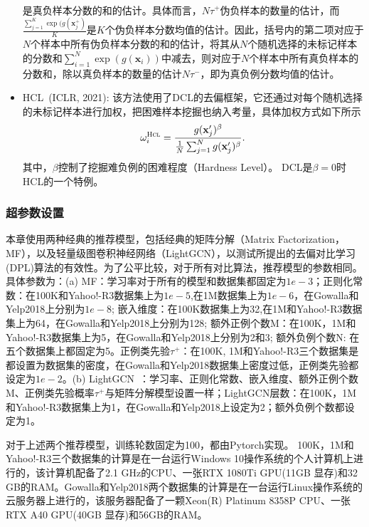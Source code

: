 \begin{itemize}
\begin{eqnarray}
	\end{eqnarray}
	是真负样本分数的和的估计。具体而言，$N\tau^+$伪负样本的数量的估计，而$\frac{\sum_{j=1}^{K} \exp(g(\mathbf{x}^+_j)}{K}$是$K$个伪负样本分数均值的估计。因此，括号内的第二项对应于$N$个样本中所有伪负样本分数的和的估计，将其从$N$个随机选择的未标记样本的分数和$\sum_{i=1}^{N} \exp(g(\mathbf{x}_i))$中减去，则对应于$N$个样本中所有真负样本的分数和，除以真负样本的数量的估计$N\tau^-$，即为真负例分数均值的估计。
	\item HCL~\cite{Robinson:2021:ICLR}(ICLR, 2021): 该方法使用了DCL的去偏框架，它还通过对每个随机选择的未标记样本进行加权，把困难样本挖掘也纳入考量，具体加权方式如下所示
	\begin{eqnarray}\label{eq:hcl}
		\omega_i^\textsc{Hcl} = \frac{g(\mathbf{x}^\prime_j)^\beta}{\frac{1}{N} \sum_{j=1}^{N}g(\mathbf{x}^\prime_j)^\beta}.
	\end{eqnarray}
	其中，$\beta$控制了挖掘难负例的困难程度（Hardness Level）。 DCL是$\beta=0$时HCL的一个特例。
\end{itemize}

\subsubsection{超参数设置}
本章使用两种经典的推荐模型，包括经典的矩阵分解（Matrix Factorization，MF），以及轻量级图卷积神经网络（LightGCN）\cite{Xiangnan:2020:SIGIR}，以测试所提出的去偏对比学习(DPL)算法的有效性。为了公平比较，对于所有对比算法，推荐模型的参数相同。具体参数为：(a) MF：学习率对于所有的模型和数据集都固定为$1e-3$；正则化常数：在100K和Yahoo!-R3数据集上为$1e-5$,在1M数据集上为$1e-6$，在Gowalla和Yelp2018上分别为$1e-8$; 嵌入维度：在100K数据集上为32,在1M和Yahoo!-R3数据集上为64，在Gowalla和Yelp2018上分别为128; 额外正例个数M：在100K，1M和Yahoo!-R3数据集上为5，在Gowalla和Yelp2018上分别为2和3; 额外负例个数N: 在五个数据集上都固定为5。正例类先验$\tau^+$：在100K, 1M和Yahoo!-R3三个数据集是都设置为数据集的密度，在Gowalla和Yelp2018数据集上密度过低，正例类先验都设定为$1e-2$。(b) LightGCN~\cite{Xiangnan:2020:SIGIR}：学习率、正则化常数、嵌入维度、额外正例个数M、正例类先验概率$\tau^+$与矩阵分解模型设置一样；LightGCN层数：在100K，1M和Yahoo!-R3数据集上为1，在Gowalla和Yelp2018上设定为2；额外负例个数都设定为1。

对于上述两个推荐模型，训练轮数固定为100，都由Pytorch实现。
100K，1M和Yahoo!-R3三个数据集的计算是在一台运行Windows 10操作系统的个人计算机上进行的，该计算机配备了2.1 GHz的CPU、一张RTX 1080Ti GPU(11GB 显存)和32 GB的RAM。Gowalla和Yelp2018两个数据集的计算是在一台运行Linux操作系统的云服务器上进行的，该服务器配备了一颗Xeon(R) Platinum 8358P CPU、一张RTX A40 GPU(40GB 显存)和56GB的RAM。

